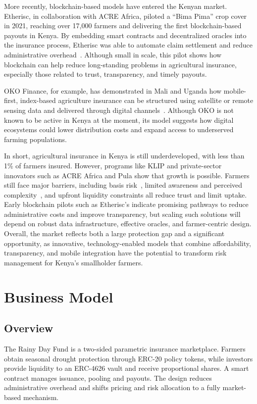 \documentclass[11pt,a4paper]{article}
\begin{document}
		More recently, blockchain-based models have entered the Kenyan market.
		Etherisc, in collaboration with ACRE Africa, piloted a \enquote{Bima Pima} crop cover in 2021, reaching over 17,000 farmers and delivering the first blockchain-based payouts in Kenya.
		By embedding smart contracts and decentralized oracles into the insurance process, Etherisc was able to automate claim settlement and reduce administrative overhead~\parencite{Etherisc2021}.
		Although small in scale, this pilot shows how blockchain can help reduce long-standing problems in agricultural insurance, especially those related to trust, transparency, and timely payouts.

		OKO Finance, for example, has demonstrated in Mali and Uganda how mobile-first, index-based agriculture insurance can be structured using satellite or remote sensing data and delivered through digital channels~\parencite{ADA_OKOFinance2021}.
		Although OKO is not known to be active in Kenya at the moment, its model suggests how digital ecosystems could lower distribution costs and expand access to underserved farming populations.

		In short, agricultural insurance in Kenya is still underdeveloped, with less than 1\% of farmers insured.
		However, programs like KLIP and private-sector innovators such as ACRE Africa and Pula show that growth is possible.
		Farmers still face major barriers, including basis risk~\parencite{Jensen2016}, limited awareness and perceived complexity~\parencite{Janzen2020}, and upfront liquidity constraints all reduce trust and limit uptake.
		Early blockchain pilots such as Etherisc's indicate promising pathways to reduce administrative costs and improve transparency, but scaling such solutions will depend on robust data infrastructure, effective oracles, and farmer-centric design.
		Overall, the market reflects both a large protection gap and a significant opportunity, as innovative, technology-enabled models that combine affordability, transparency, and mobile integration have the potential to transform risk management for Kenya's smallholder farmers.

        \section{Business Model}\label{sec:business-model}

        \subsection{Overview}\label{subsec:overview}
        The Rainy Day Fund is a two-sided parametric insurance marketplace.
        Farmers obtain seasonal drought protection through ERC-20 policy tokens, while investors provide liquidity to an ERC-4626 vault and receive proportional shares.
        A smart contract manages issuance, pooling and payouts.
        The design reduces administrative overhead and shifts pricing and risk allocation to a fully market-based mechanism.
\end{document}
